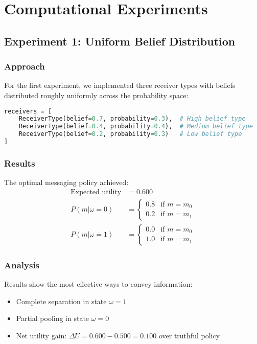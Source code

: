 \documentclass[12pt]{article}
\theoremstyle{plain}
\theoremstyle{definition}
\theoremstyle{remark}
\begin{document}
\section{Computational Experiments}

\subsection{Experiment 1: Uniform Belief Distribution}

\subsubsection{Approach}
For the first experiment, we implemented three receiver types with beliefs distributed roughly uniformly across the probability space:

\begin{lstlisting}[language=Python, caption=Experiment 1 Setup]
receivers = [
    ReceiverType(belief=0.7, probability=0.3),  # High belief type
    ReceiverType(belief=0.4, probability=0.4),  # Medium belief type
    ReceiverType(belief=0.2, probability=0.3)   # Low belief type
]
\end{lstlisting}

\subsubsection{Results}
The optimal messaging policy achieved:
\begin{align*}
    \text{Expected utility} &= 0.600 \\
    P(m|\omega=0) &= \begin{cases}
        0.8 & \text{if } m = m_0 \\
        0.2 & \text{if } m = m_1
    \end{cases} \\
    P(m|\omega=1) &= \begin{cases}
        0.0 & \text{if } m = m_0 \\
        1.0 & \text{if } m = m_1
    \end{cases}
\end{align*}

\subsubsection{Analysis}
Results show the most effective ways to convey information:
\begin{itemize}
    \item Complete separation in state $\omega=1$
    \item Partial pooling in state $\omega=0$
    \item Net utility gain: $\Delta U = 0.600 - 0.500 = 0.100$ over truthful policy
\end{itemize}
\end{document}
